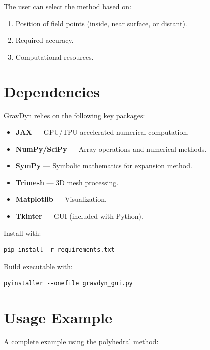 \documentclass[a4paper,12pt]{article}
\begin{document}
The user can select the method based on:
\begin{enumerate}
    \item Position of field points (inside, near surface, or distant).
    \item Required accuracy.
    \item Computational resources.
\end{enumerate}

\section{Dependencies}

GravDyn relies on the following key packages:
\begin{itemize}
    \item \textbf{JAX} — GPU/TPU-accelerated numerical computation.
    \item \textbf{NumPy/SciPy} — Array operations and numerical methods.
    \item \textbf{SymPy} — Symbolic mathematics for expansion method.
    \item \textbf{Trimesh} — 3D mesh processing.
    \item \textbf{Matplotlib} — Visualization.
    \item \textbf{Tkinter} — GUI (included with Python).
\end{itemize}

Install with:
\begin{verbatim}
pip install -r requirements.txt
\end{verbatim}

Build executable with:
\begin{verbatim}
pyinstaller --onefile gravdyn_gui.py
\end{verbatim}

\section{Usage Example}

A complete example using the polyhedral method:
\end{document}
